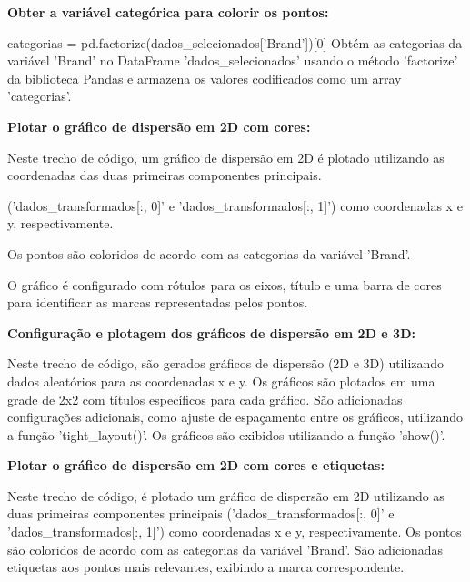 \documentclass[12pt, a4paper]{article}
\begin{document}
\textbf{Obter a variável categórica para colorir os pontos:}


categorias = pd.factorize(dados\_selecionados['Brand'])[0] 
Obtém as categorias da variável 'Brand' no DataFrame 
'dados\_selecionados' usando o método 'factorize' 
da biblioteca Pandas e armazena os valores 
codificados como um array 'categorias'.


\textbf{Plotar o gráfico de dispersão em 2D com cores:}



Neste trecho de código, um gráfico de dispersão em 2D 
é plotado utilizando as coordenadas das duas primeiras 
componentes principais.

('dados\_transformados[:, 0]' e 'dados\_transformados[:, 1]')
como coordenadas x e y, respectivamente.

Os pontos são coloridos de acordo com as 
categorias da variável 
'Brand'.

O gráfico é configurado com rótulos para os eixos, 
título e uma barra de cores para identificar as 
marcas representadas pelos pontos.



\textbf{Configuração e plotagem dos gráficos de dispersão em 2D e 3D:}



Neste trecho de código, são gerados gráficos de dispersão (2D e 3D) 
utilizando dados aleatórios para as coordenadas x e y.
Os gráficos são plotados em uma grade de 2x2 com títulos 
específicos para cada gráfico.
São adicionadas configurações adicionais, como ajuste de espaçamento 
entre os gráficos, utilizando a função 'tight\_layout()'.
Os gráficos são exibidos utilizando a função 'show()'.




\textbf{Plotar o gráfico de dispersão em 2D com cores e etiquetas:}



Neste trecho de código, é plotado um gráfico de dispersão em 
2D utilizando as duas primeiras componentes principais
('dados\_transformados[:, 0]' e 'dados\_transformados[:, 1]') 
como coordenadas x e y, respectivamente.
Os pontos são coloridos de acordo com as 
categorias da variável 'Brand'.
São adicionadas etiquetas aos pontos 
mais relevantes, exibindo a marca correspondente.
\end{document}

